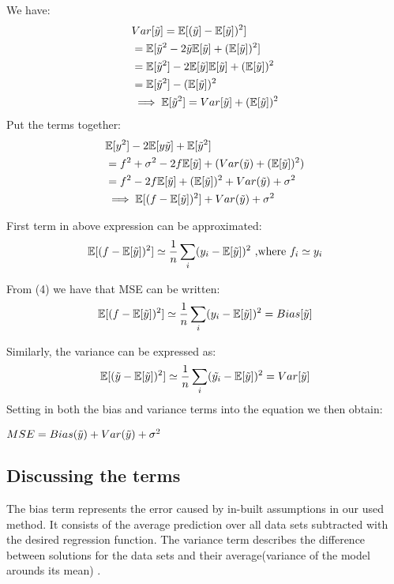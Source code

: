 We have:
\begin{align*}
    & Var[\Tilde{y}]=\mathbb{E}[(\Tilde{y}]-\mathbb{E}[\Tilde{y}])^2]\\
    & = \mathbb{E}[\Tilde{y}^2-2\Tilde{y}\mathbb{E}[\Tilde{y}]+(\mathbb{E}[\Tilde{y}])^2]\\
    & = \mathbb{E}[\Tilde{y}^2]-2\mathbb{E}[\Tilde{y}]\mathbb{E}[\Tilde{y}]+(\mathbb{E}[\Tilde{y}])^2\\
    & = \mathbb{E}[\Tilde{y}^2]-(\mathbb{E}[\Tilde{y}])^2\\
    & \implies \mathbb{E}[\Tilde{y}^2]= Var[\Tilde{y}]+(\mathbb{E}[\Tilde{y}])^2
\end{align*}
%
Put the terms together:
\begin{align*}
    & \mathbb{E}[y^2]-2\mathbb{E}[y\Tilde{y}]+\mathbb{E}[\Tilde{y}^2]\\
    & = f^2+\sigma^2-2f\mathbb{E}[\Tilde{y}]+(Var(\Tilde{y})+(\mathbb{E}[\Tilde{y}])^2)\\
    & = f^2-2f\mathbb{E}[\Tilde{y}]+(\mathbb{E}[\Tilde{y}])^2+Var(\Tilde{y})+\sigma^2\\
    & \implies \mathbb{E}[(f-\mathbb{E}[\Tilde{y}])^2]+Var(\Tilde{y})+\sigma^2
\end{align*}

First term in above expression can be approximated:
\begin{equation}
    \mathbb{E}[(f-\mathbb{E}[\Tilde{y}])^2] \simeq \frac{1}{n}\sum_{i}(y_i-\mathbb{E}[\Tilde{y}])^2 \text{ ,where } f_i\simeq y_i
\end{equation}

From (4) we have that MSE can be written:
\begin{equation}
    \mathbb{E}[(f-\mathbb{E}[\Tilde{y}])^2] \simeq \frac{1}{n}\sum_{i}(y_i-\mathbb{E}[\Tilde{y}])^2 = Bias[\Tilde{y}]
\end{equation}

Similarly, the variance can be expressed as:
\begin{align*}
    \mathbb{E}[(\Tilde{y}-\mathbb{E}[\Tilde{y}])^2]\simeq\frac{1}{n}\sum_{i}(\Tilde{y_i}-\mathbb{E}[\Tilde{y}])^2 = Var[\Tilde{y}]
\end{align*}
Setting in both the bias and variance terms into the equation we then obtain:

$MSE=Bias(\Tilde{y})+Var(\Tilde{y})+\sigma^2$

\subsection{Discussing the terms}
\hfill\break
The bias term represents the error caused by in-built assumptions in our used method. It consists of the average prediction over all data sets subtracted with the desired regression function.
The variance term describes the difference between solutions for the data sets and their average(variance of the model arounds its mean) \cite{bishop_2006_pattern}.

